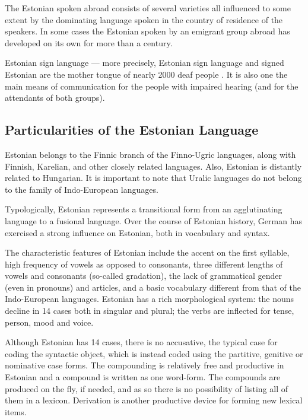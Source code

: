\documentclass[]{../metanetpaper}
\begin{document}
\begin{multicols}{2}
The Estonian spoken abroad consists of several varieties all influenced to some extent by the dominating language spoken in the country of residence of the speakers. 
In some cases the Estonian spoken by an emigrant group abroad has developed on its own for more than a century.

Estonian sign language --- more precisely, Estonian sign language and signed Estonian are the mother tongue of nearly 2000 deaf people \cite{Sign}. 
It is also one the main means of communication for the people with impaired hearing (and for the attendants of both groups).

\subsection{Particularities of the Estonian Language}

Estonian belongs to the Finnic branch of the Finno-Ugric languages, along with Finnish, Karelian, and other closely related languages. 
Also, Estonian is distantly related to Hungarian. 
It is important to note that Uralic languages do not belong to the family of Indo-European languages.

Typologically, Estonian represents a transitional form from an agglutinating language to a fusional language. 
Over the course of Estonian history, German has exercised a strong influence on Estonian, both in vocabulary and syntax. 

The characteristic features of Estonian include the accent on the first syllable, high frequency of vowels as opposed to consonants, three different lengths of vowels and consonants (so-called gradation), the lack of grammatical gender (even in pronouns) and articles, and a basic vocabulary different from that of the Indo-European languages. 
Estonian has a rich morphological system: the nouns decline in 14
cases both in singular and plural; the verbs are inflected for tense,
person, mood and voice.


Although Estonian has 14 cases, there is no accusative, the typical case for coding the syntactic object, which is instead coded using the partitive, genitive or nominative case forms.
The compounding is relatively free and productive in Estonian and a compound is written as one word-form. 
The compounds are produced on the fly, if needed, and as so there is no possibility of listing all of them in a lexicon. 
Derivation is another productive device for forming new lexical items.




\end{multicols}
\end{document}

